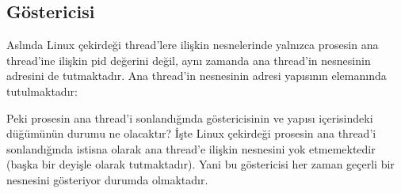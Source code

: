 \documentclass[a4paper,10pt,turkish]{sphinxmanual}
\begin{document}
\subsection{ Göstericisi}
\label{\detokenize{processcontrolblock:group-leader-gostericisi}}
\sphinxAtStartPar
Aslında Linux çekirdeği thread’lere ilişkin  nesnelerinde yalnızca prosesin ana thread’ine
ilişkin pid değerini değil, aynı zamanda ana thread’in  nesnesinin adresini de
tutmaktadır. Ana thread’in  nesnesinin adresi  yapısının 
elemanında tutulmaktadır:

\begin{sphinxVerbatim}[commandchars=\\\{\}]
\end{sphinxVerbatim}

\sphinxAtStartPar
Peki prosesin ana thread’i sonlandığında  göstericisinin ve  yapısı
içerisindeki  düğümünün durumu ne olacaktır? İşte Linux çekirdeği prosesin ana thread’i
sonlandığında istisna olarak ana thread’e ilişkin  nesnesini yok etmemektedir (başka bir
deyişle  olarak tutmaktadır). Yani bu  göstericisi her zaman geçerli
bir  nesnesini gösteriyor durumda olmaktadır.
\end{document}
